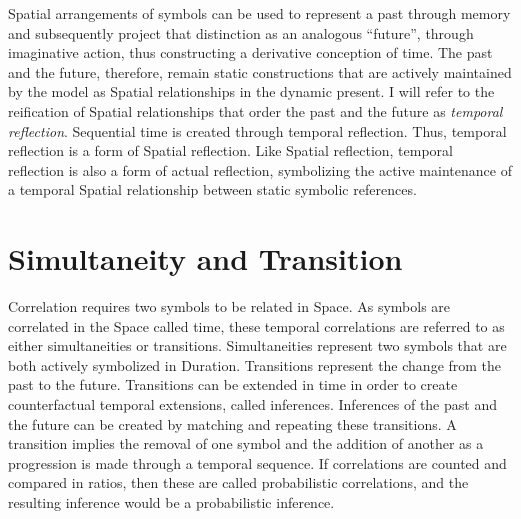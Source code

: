 Spatial arrangements of symbols can be used to represent a past
through memory and subsequently project that distinction as an
analogous ``future'', through imaginative action, thus constructing a
derivative conception of time.  The past and the future, therefore,
remain static constructions that are actively maintained by the model
as Spatial relationships in the dynamic present.  I will refer to the
reification of Spatial relationships that order the past and the
future as \emph{temporal reflection}.  Sequential time is created
through temporal reflection.  Thus, temporal reflection is a form of
Spatial reflection.  Like Spatial reflection, temporal reflection is
also a form of actual reflection, symbolizing the active maintenance
of a temporal Spatial relationship between static symbolic references.

\section{Simultaneity and Transition}

Correlation requires two symbols to be related in Space.  As symbols
are correlated in the Space called time, these temporal correlations
are referred to as either simultaneities or transitions.
Simultaneities represent two symbols that are both actively symbolized
in Duration.  Transitions represent the change from the past to the
future.  Transitions can be extended in time in order to create
counterfactual temporal extensions, called inferences.  Inferences of
the past and the future can be created by matching and repeating these
transitions.  A transition implies the removal of one symbol and the
addition of another as a progression is made through a temporal
sequence.  If correlations are counted and compared in ratios, then
these are called probabilistic correlations, and the resulting
inference would be a probabilistic inference.


